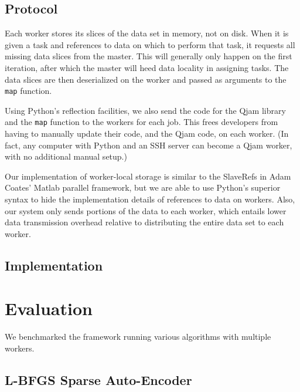 \documentclass[%
  final,
  notitlepage,
  narroweqnarray,
  inline,
]{ieee}
\begin{document}
\subsection{Protocol}
\label{Protocol}


Each worker stores its slices of the data set in memory, not on disk. When it
is given a task and references to data on which to perform that task, it
requests all missing data slices from the master. This will generally only
happen on the first iteration, after which the master will heed data locality
in assigning tasks. The data slices are then deserialized on the worker and
passed as arguments to the {\tt map} function.

Using Python's reflection facilities, we also send the code for the Qjam
library and the {\tt map} function to the workers for each job. This frees
developers from having to manually update their code, and the Qjam code, on
each worker. (In fact, any computer with Python and an SSH server can become a
Qjam worker, with no additional manual setup.)

Our implementation of worker-local storage is similar to the SlaveRefs in Adam
Coates' Matlab parallel framework, but we are able to use Python's superior
syntax to hide the implementation details of references to data on
workers. Also, our system only sends portions of the data to each worker, which
entails lower data transmission overhead relative to distributing the entire
data set to each worker.

\subsection{Implementation}
\label{Implementation}


\section{Evaluation}

We benchmarked the framework running various algorithms with multiple workers.

\subsection{L-BFGS Sparse Auto-Encoder}
\end{document}
